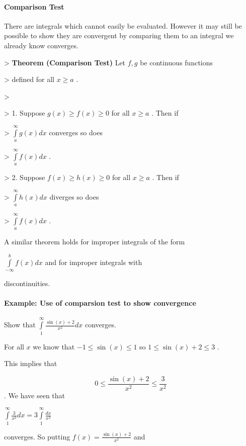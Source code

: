\paragraph{Comparison Test}



There are integrals which cannot easily be evaluated. However it may still be possible to show they are convergent by comparing them to an integral we already know converges.



> \textbf{Theorem (Comparison Test)} Let $f,g$ be continuous functions

> defined for all $x\ge a$ .

>

> 1.  Suppose $g(x)\ge f(x)\ge0$ for all $x\ge a$ . Then if

>     $\int\limits _a^\infty g(x)dx$ converges so does

>     $\int\limits _a^\infty f(x)dx$ .

> 2.  Suppose $f(x)\ge h(x)\ge0$ for all $x\ge a$ . Then if

>     $\int\limits _a^\infty h(x)dx$ diverges so does

>     $\int\limits _a^\infty f(x)dx$ .



A similar theorem holds for improper integrals of the form

$\int\limits _{-\infty}^b f(x)dx$ and for improper integrals with

discontinuities.



\paragraph{Example: Use of comparsion test to show convergence}



Show that $\int\limits _1^\infty\frac{\sin(x)+2}{x^2}dx$ converges.



For all $x$ we know that $-1\le\sin(x)\le 1$ so $1\le\sin(x)+2\le3$ .

This implies that



$$0\le\frac{\sin(x)+2}{x^2}\le\frac{3}{x^2}$$ . We have seen that

$\int\limits _1^\infty\frac{3}{x^2}dx=3\int\limits _1^\infty\frac{dx}{x^2}$

converges. So putting $f(x)=\frac{\sin(x)+2}{x^2}$ and

